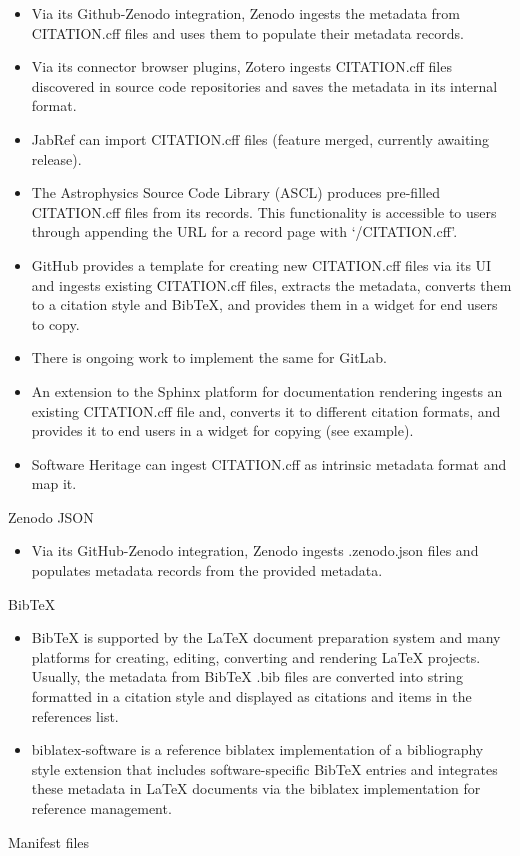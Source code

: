 \documentclass{article}
\begin{document}
\begin{itemize}  
\item Via its Github-Zenodo integration, Zenodo ingests the metadata from CITATION.cff files and uses them to populate their metadata records.


\item Via its connector browser plugins, Zotero ingests CITATION.cff files discovered in source code repositories and saves the metadata in its internal format. 


\item JabRef can import CITATION.cff files (feature merged, currently awaiting release). 


\item The Astrophysics Source Code Library (ASCL) produces pre-filled CITATION.cff files from its records. This functionality is accessible to users through appending the URL for a record page with ‘/CITATION.cff’. 


\item GitHub provides a template for creating new CITATION.cff files via its UI and ingests existing CITATION.cff files, extracts the metadata, converts them to a citation style and BibTeX, and provides them in a widget for end users to copy.


\item There is ongoing work to implement the same for GitLab.


\item An extension to the Sphinx platform for documentation rendering ingests an existing CITATION.cff file and, converts it to different citation formats, and provides it to end users in a widget for copying (see example).


\item Software Heritage can ingest CITATION.cff as intrinsic metadata format and map it.


\end{itemize}Zenodo JSON 

\begin{itemize}  
\item Via its GitHub-Zenodo integration, Zenodo ingests .zenodo.json files and populates metadata records from the provided metadata.


\end{itemize}BibTeX 

\begin{itemize}  
\item BibTeX is supported by the LaTeX document preparation system and many platforms for creating, editing, converting and rendering LaTeX projects. Usually, the metadata from BibTeX .bib files are converted into string formatted in a citation style and displayed as citations and items in the references list.


\item biblatex-software\cite{138880/DXRLT553} is a reference biblatex implementation of a bibliography style extension that includes software-specific BibTeX entries and integrates these metadata in LaTeX documents via the biblatex implementation for reference management.


\end{itemize}Manifest files 
\end{document}
